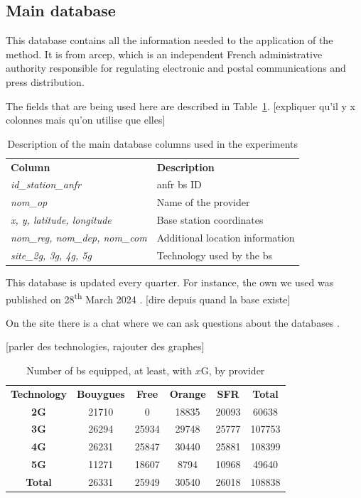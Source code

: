 \documentclass[lettersize,journal,english]{IEEEtran}
\begin{document}
\subsection{Main database}
This database \cite{main_database} contains all the information needed to the application of the method. It is from
\acrfull{arcep}, which is an independent French administrative authority responsible for regulating electronic and postal communications and press distribution.

The fields that are being used here are described in Table~\ref{table:data_columns}. [expliquer qu'il y x colonnes mais qu'on utilise que elles]
\begin{table}[!b]
    \centering
    \caption{Description of the main database columns used in the experiments}
    \label{table:data_columns}
    \begin{tabular}{ll}
        \toprule
        \textbf{Column} & \textbf{Description} \\
        \cmidrule(lr){1-2}
        \textsl{id\_station\_anfr} & \acrshort{anfr} \acrshort{bs} ID \\ 
        \textsl{nom\_op} & Name of the provider \\
        \textsl{x, y, latitude, longitude} & Base station coordinates \\ 
        \textsl{nom\_reg, nom\_dep, nom\_com} & Additional location information \\  
        \textsl{site\_2g, 3g, 4g, 5g} & Technology used by the \acrshort{bs} \\ 
        \bottomrule
    \end{tabular}
\end{table}

This database is updated every quarter. For instance, the own we used was published on 28\textsuperscript{th} March 2024 \cite{main_database_hist}. [dire depuis quand la base existe]

On the site there is a chat where we can ask questions about the databases \cite{main_database_chat}.

[parler des technologies, rajouter des graphes]

\begin{table}[!t]
    \centering
    \caption{Number of \acrfull{bs} equipped, at least, with $x$G, by provider}
    \label{table:techno_numbers}
    \begin{tabular}{cccccc}
        \toprule
        \textbf{Technology} & \textbf{Bouygues} & \textbf{Free} & \textbf{Orange} & \textbf{SFR} & \textbf{Total} \\
        \cmidrule(lr){1-6}
        \textbf{2G} & 21710 & 0 & 18835 & 20093 & 60638 \\
        \textbf{3G} & 26294 & 25934 & 29748 & 25777 & 107753 \\
        \textbf{4G} & 26231 & 25847 & 30440 & 25881 & 108399 \\
        \textbf{5G} & 11271 & 18607 & 8794 & 10968 & 49640 \\
        \textbf{Total} & 26331 & 25949 & 30540 & 26018 & 108838 \\
        \bottomrule
    \end{tabular}
\end{table}
\end{document}
